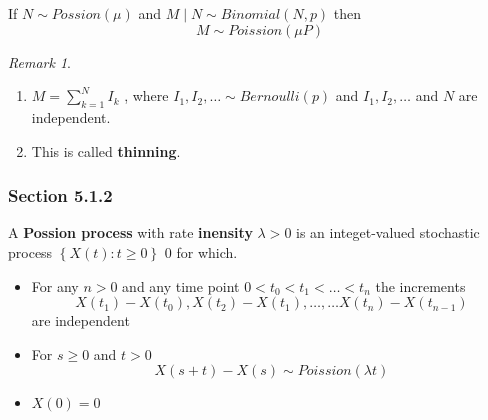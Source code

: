 \documentclass{article}
\theoremstyle{remark}
\newtheorem*{remark}{Remark}
\begin{document}
\begin{theorem}
  If $N \sim Possion(\mu )$  and $ M  \mid  N \sim Binomial(N,p)$ then \[
    M \sim Poission(\mu P)
  \]
\end{theorem}

\begin{remark}
  \begin{enumerate}[label=(\roman*)]
    \item $M = \sum_{k= 1}^{ N}  I_{k}$ , where $ I_{1}, I_{2} , \ldots \sim Bernoulli (p)$ and $I_{1}, I_{2} , \ldots$ and $N$ are independent.
    \item This is called \textbf{thinning}.
  \end{enumerate}
\end{remark}

\subsubsection{Section 5.1.2}%
\label{ssub:section_5_1_2}

\begin{definition}
  A \textbf{Possion process}  with rate  \textbf{inensity}  $ \lambda > 0$ is an integet-valued stochastic process $\left\{ X\left( t \right): t \ge 0 \right\}$ 0 for which.
  \begin{itemize}
    \item For any $n>0$ and any time point $0< t_{0} < t_{1} < \ldots < t_{n}$ the increments \[
    X\left( t_{1}  \right) - X\left( t_{0} \right) , X\left( t_{2} \right) - X\left( t_{1} \right) , \ldots , \ldots X\left( t_{n} \right) - X\left( t_{n-1} \right)
    \]
    are independent
  \item For $s\ge 0$ and $t> 0$  \[
      X\left( s+t \right)  - X\left( s \right) \sim Poission(\lambda t)
  \]
\item $X\left( 0 \right) = 0$
  \end{itemize}
\end{definition}
\end{document}
